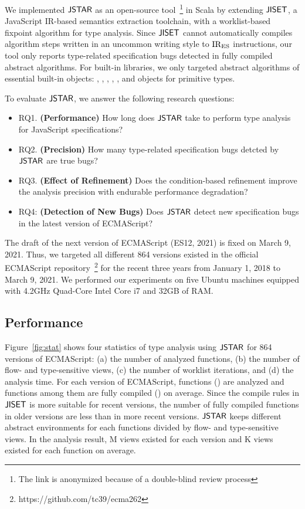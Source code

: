We implemented $\tool$ as an open-source tool~\footnote{The link is anonymized
because of a double-blind review process} in Scala by extending $\jiset$, a
JavaScript IR-based semantics extraction toolchain, with a worklist-based
fixpoint algorithm for type analysis.  Since $\jiset$ cannot automatically
compiles algorithm steps written in an uncommon writing style to ${\text{IR}_\text{ES}}$
instructions, our tool only reports type-related specification bugs detected in
fully compiled abstract algorithms.  For built-in libraries, we only targeted
abstract algorithms of essential built-in objects: ,
, , , , and objects
for primitive types.

To evaluate $\tool$, we answer the following research questions:
\begin{itemize}
  \item RQ1. \textbf{(Performance)} How long does $\tool$ take to perform type
    analysis for JavaScript specifications?
  \item RQ2. \textbf{(Precision)} How many type-related specification bugs
    detcted by $\tool$ are true bugs?
  \item RQ3. \textbf{(Effect of Refinement)} Does the condition-based refinement
    improve the analysis precision with endurable performance degradation?
  \item RQ4: \textbf{(Detection of New Bugs)} Does $\tool$ detect new
    specification bugs in the latest version of ECMAScript?
\end{itemize}
The draft of the next version of ECMAScript (ES12, 2021) is fixed on March 9,
2021.  Thus, we targeted all different 864 versions existed in the official
ECMAScript repository~\footnote{https://github.com/tc39/ecma262} for the recent
three years from January 1, 2018 to March 9, 2021.  We performed our experiments
on five Ubuntu machines equipped with 4.2GHz Quad-Core Intel Core i7 and 32GB of
RAM.


\subsection{Performance}\label{sec:performance}

Figure~\ref{fig:stat} shows four statistics of type analysis using $\tool$ for
864 versions of ECMAScript: (a) the number of analyzed functions, (b) the number
of flow- and type-sensitive views, (c) the number of worklist iterations, and
(d) the analysis time.  For each version of ECMAScript, 
functions () are analyzed and  functions among them
are fully compiled () on average.  Since the compile rules in
$\jiset$ is more suitable for recent versions, the number of fully compiled
functions in older versions are less than in more recent versions.  $\tool$
keeps different abstract environments for each functions divided by flow- and
type-sensitive views.  In the analysis result, M views existed for
each version and K views existed for each function on average.

